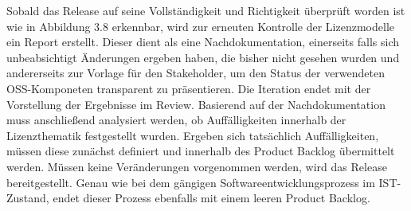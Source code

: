 Sobald das Release auf seine Vollständigkeit und Richtigkeit überprüft worden ist wie in Abbildung 3.8 erkennbar, wird zur erneuten Kontrolle der Lizenzmodelle ein Report erstellt. Dieser dient als eine Nachdokumentation, einerseits falls sich unbeabsichtigt Änderungen ergeben haben, die bisher nicht gesehen wurden und andererseits zur Vorlage für den Stakeholder, um den Status der verwendeten OSS-Komponeten transparent zu präsentieren. Die Iteration endet mit der Vorstellung der Ergebnisse im Review. Basierend auf der Nachdokumentation muss anschließend analysiert werden, ob Auffälligkeiten innerhalb der Lizenzthematik festgestellt wurden. Ergeben sich tatsächlich Auffälligkeiten, müssen diese zunächst definiert und innerhalb des Product Backlog übermittelt werden. Müssen keine Veränderungen vorgenommen werden, wird das Release bereitgestellt. Genau wie bei dem gängigen Softwareentwicklungsprozess im IST-Zustand, endet dieser Prozess ebenfalls mit einem leeren Product Backlog.  

















